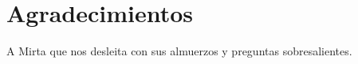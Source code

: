 \chapter*{Agradecimientos}

\noindent A Mirta que nos desleita con sus almuerzos y preguntas sobresalientes.
